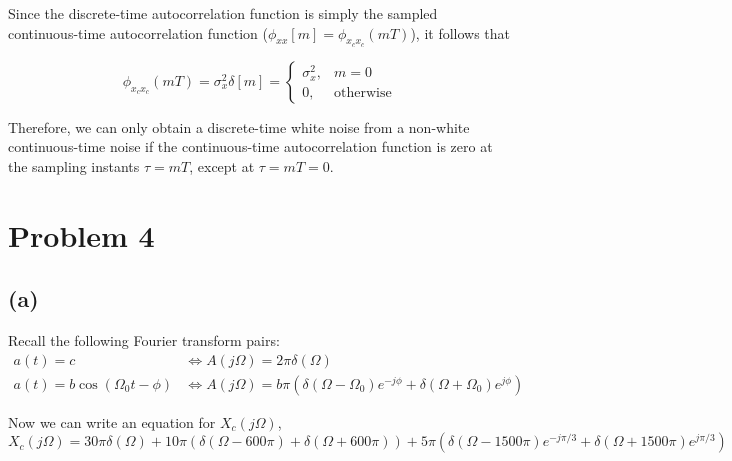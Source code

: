 \documentclass{article}
\begin{document}
Since the discrete-time autocorrelation function is simply the sampled continuous-time autocorrelation function ($\phi_{xx}[m] = \phi_{x_cx_c}(mT)$), it follows that

\begin{equation}
\phi_{x_cx_c}(mT) = \sigma_x^2\delta[m] = \begin{cases}
\sigma_x^2, & m = 0 \\
0, & \text{otherwise}
\end{cases}
\end{equation}

Therefore, we can only obtain a discrete-time white noise from a non-white continuous-time noise if the continuous-time autocorrelation function is zero at the sampling instants $\tau = mT$, except at $\tau = mT = 0$.

\section{Problem 4}	
\subsection{(a)}

Recall the following Fourier transform pairs:
\begin{align}
a(t) = c &\Longleftrightarrow A(j\Omega) = 2\pi\delta(\Omega) \tag{constant} \\
a(t) = b\cos(\Omega_0t - \phi) &\Longleftrightarrow A(j\Omega) = b\pi(\delta(\Omega-\Omega_0)e^{-j\phi} + \delta(\Omega+\Omega_0)e^{j\phi}) \tag{cosine}
\end{align}

Now we can write an equation for $X_c(j\Omega)$,
\begin{equation}
X_c(j\Omega) = 30\pi\delta(\Omega) + 10\pi(\delta(\Omega-600\pi) + \delta(\Omega+600\pi)) + 5\pi(\delta(\Omega-1500\pi)e^{-j\pi/3} + \delta(\Omega+1500\pi)e^{j\pi/3})
\end{equation}
\end{document}
